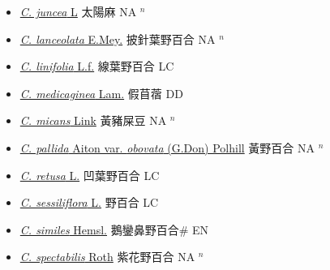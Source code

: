 \begin{itemize}
\begin{itemize}
        \item[] \href{http://www.theplantlist.org/tpl1.1/search?q=Crotalaria+juncea}{\textit{C. juncea} L}   太陽麻 NA $^n$
        \item[] \href{http://www.theplantlist.org/tpl1.1/search?q=Crotalaria+lanceolata}{\textit{C. lanceolata} E.Mey.}   披針葉野百合 NA $^n$
        \item[] \href{http://www.theplantlist.org/tpl1.1/search?q=Crotalaria+linifolia}{\textit{C. linifolia} L.f.}   線葉野百合 LC
        \item[] \href{http://www.theplantlist.org/tpl1.1/search?q=Crotalaria+medicaginea}{\textit{C. medicaginea} Lam.}   假苜蓿 DD
        \item[] \href{http://www.theplantlist.org/tpl1.1/search?q=Crotalaria+micans}{\textit{C. micans} Link}   黃豬屎豆 NA $^n$
        \item[] \href{http://www.theplantlist.org/tpl1.1/search?q=Crotalaria+pallida+var.+obovata}{\textit{C. pallida} Aiton var. \textit{obovata} (G.Don) Polhill}   黃野百合 NA $^n$
        \item[] \href{http://www.theplantlist.org/tpl1.1/search?q=Crotalaria+retusa}{\textit{C. retusa} L.}   凹葉野百合 LC
        \item[] \href{http://www.theplantlist.org/tpl1.1/search?q=Crotalaria+sessiliflora}{\textit{C. sessiliflora} L.}   野百合 LC
        \item[] \href{http://www.theplantlist.org/tpl1.1/search?q=Crotalaria+similes}{\textit{C. similes} Hemsl.}   鵝鑾鼻野百合\# EN
        \item[] \href{http://www.theplantlist.org/tpl1.1/search?q=Crotalaria+spectabilis}{\textit{C. spectabilis} Roth}   紫花野百合 NA $^n$

\end{itemize}
\end{itemize}
